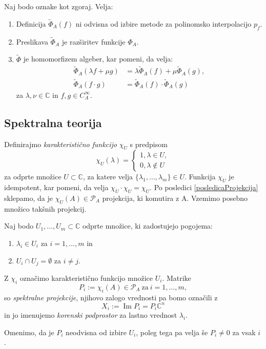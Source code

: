 \documentclass[mat1]{fmfdelo}
\newcommand{\C}{\mathbb C}
\DeclareMathOperator{\Ima}{Im}
\begin{document}
\begin{trditev} \label{trditevPhiAlgebra}
    Naj bodo oznake kot zgoraj. Velja:
    \begin{enumerate}
        \item Definicija $\widetilde{\Phi}_A(f)$ ni odvisna od izbire metode za polinomsko interpolacijo $p_f$.
        \item Preslikava $\widetilde{\Phi}_A$ je razširitev funkcije $\Phi_A$.
        \item $\widetilde{\Phi}$ je homomorfizem algeber, kar pomeni, da velja:
        \begin{align*}
            \widetilde{\Phi}_A(\lambda f + \mu g) &= \lambda \widetilde{\Phi}_A(f) + \mu \widetilde{\Phi}_A(g), \\
            \widetilde{\Phi}_A(f \cdot g) &= \widetilde{\Phi}_A(f) \cdot \widetilde{\Phi}_A(g)
        \end{align*}
        za $\lambda, \nu \in \C$ in $f, g \in C_A^\infty$.
    \end{enumerate}
\end{trditev}

\subsection{Spektralna teorija}
Definirajmo \emph{karakteristično funkcijo} $\chi_U$ s predpisom
\begin{equation}
    \chi_U(\lambda) =
    \begin{cases}
        1, \lambda \in U, \\
        0, \lambda \notin U
    \end{cases}
\end{equation}
za odprte množice $U \subset \C$, za katere velja $\{\lambda_1, \ldots, \lambda_m\} \in U$. Funkcija $\chi_U$ je idempotent, kar pomeni, da velja $\chi_U \cdot \chi_U = \chi_U$. Po posledici \ref{posledicaProjekcija} sklepamo, da je $\chi_U(A) \in \mathcal{P}_A$ projekcija, ki komutira z A. Vzemimo posebno množico takšnih projekcij.
\begin{definicija}
Naj bodo $U_1, \ldots, U_m \subset \C$ odprte množice, ki zadostujejo pogojema:
\begin{enumerate}
    \item $\lambda_i \in U_i$ za $i = 1,\ldots,m$ in
    \item $U_i \cap U_j = \emptyset$ za $i \neq j$.
\end{enumerate}
Z $\chi_i$ označimo karakteristično funkcijo množice $U_i$. Matrike
\begin{equation} \label{definicijaProjekcije}
    P_i := \chi_i(A) \in \mathcal{P}_A\ \text{za}\ i = 1,\ldots, m,
\end{equation}
so \emph{spektralne projekcije}, njihovo zalogo vrednosti pa bomo označili z 
\begin{equation} \label{zalogeProjekcij}
    X_i := \Ima P_i = P_i \C^n
\end{equation}
in jo imenujemo \emph{korenski podprostor} za lastno vrednost $\lambda_i$.
\end{definicija}
Omenimo, da je $P_i$ neodvisna od izbire $U_i$, poleg tega pa velja še $P_i \neq 0$ za vsak $i$.
\end{document}
